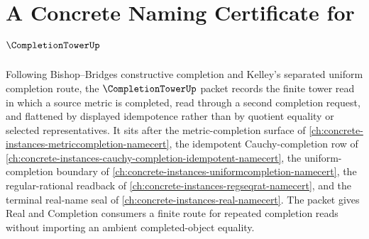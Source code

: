\chapter{A Concrete Naming Certificate for $\CompletionTowerUp$}
\label{ch:concrete-instances-completion-tower-namecert}

Following Bishop--Bridges constructive completion and Kelley's separated uniform completion route, the $\CompletionTowerUp$ packet records the finite tower read in which a source metric is completed, read through a second completion request, and flattened by displayed idempotence rather than by quotient equality or selected representatives. It sits after the metric-completion surface of \autoref{ch:concrete-instances-metriccompletion-namecert}, the idempotent Cauchy-completion row of \autoref{ch:concrete-instances-cauchy-completion-idempotent-namecert}, the uniform-completion boundary of \autoref{ch:concrete-instances-uniformcompletion-namecert}, the regular-rational readback of \autoref{ch:concrete-instances-regseqrat-namecert}, and the terminal real-name seal of \autoref{ch:concrete-instances-real-namecert}. The packet gives Real and Completion consumers a finite route for repeated completion reads without importing an ambient completed-object equality.

